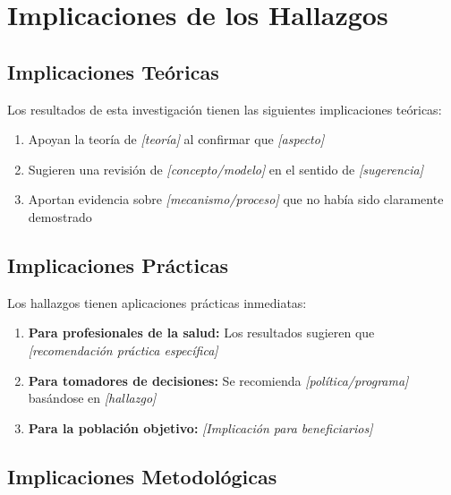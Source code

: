 \section{Implicaciones de los Hallazgos}
\label{sec:implicaciones}

\subsection{Implicaciones Teóricas}
\label{subsec:implicaciones_teoricas}

Los resultados de esta investigación tienen las siguientes implicaciones teóricas:

\begin{enumerate}
    \item Apoyan la teoría de \textit{{[teoría]}} al confirmar que \textit{{[aspecto]}}
    \item Sugieren una revisión de \textit{{[concepto/modelo]}} en el sentido de \textit{{[sugerencia]}}
    \item Aportan evidencia sobre \textit{{[mecanismo/proceso]}} que no había sido claramente demostrado
\end{enumerate}

\subsection{Implicaciones Prácticas}
\label{subsec:implicaciones_practicas}

Los hallazgos tienen aplicaciones prácticas inmediatas:

\begin{enumerate}
    \item \textbf{Para profesionales de la salud:} Los resultados sugieren que \textit{{[recomendación práctica específica]}}
    
    \item \textbf{Para tomadores de decisiones:} Se recomienda \textit{{[política/programa]}} basándose en \textit{{[hallazgo]}}
    
    \item \textbf{Para la población objetivo:} \textit{{[Implicación para beneficiarios]}}
\end{enumerate}

\subsection{Implicaciones Metodológicas}
\label{subsec:implicaciones_metodologicas}

